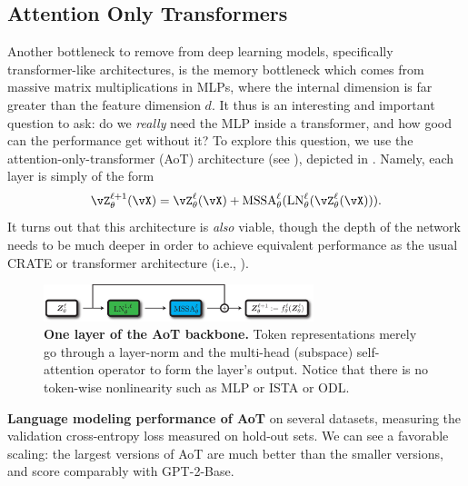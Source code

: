 \documentclass[../../book-main.tex]{subfiles}
\begin{document}
\subsection{Attention Only Transformers} \label{sub:aot_experiments}

Another bottleneck to remove from deep learning models, specifically transformer-like architectures, is the memory bottleneck which comes from massive matrix multiplications in MLPs, where the internal dimension is far greater than the feature dimension \(d\). It thus is an interesting and important question to ask: do we \textit{really} need the MLP inside a transformer, and how good can the performance get without it? To explore this question, we use the attention-only-transformer (AoT) architecture (see ), depicted in . Namely, each layer is simply of the form 
\begin{equation}
    \vZ_{\theta}^{\ell + 1}(\vX) = \vZ_{\theta}^{\ell}(\vX) + \MSSA_{\theta}^{\ell}(\LN_{\theta}^{\ell}(\vZ_{\theta}^{\ell}(\vX))).
\end{equation}
It turns out that this architecture is \textit{also} viable, though the depth of the network needs to be much deeper in order to achieve equivalent performance as the usual CRATE or transformer architecture (i.e., ).


\begin{figure}
    \centering 
    \includegraphics[width=0.7\textwidth]{figs_chap7/aot_backbone.pdf}
    \caption{\small\textbf{One layer of the AoT backbone.} Token representations merely go through a layer-norm and the multi-head (subspace) self-attention operator to form the layer's output. Notice that there is no token-wise nonlinearity such as MLP or ISTA or ODL.}
    \label{fig:aot_backbone}
\end{figure}

\begin{table}
    \centering 
    \caption{\small\textbf{Language modeling performance of AoT} on several datasets, measuring the validation cross-entropy loss measured on hold-out sets. We can see a favorable scaling: the largest versions of AoT are much better than the smaller versions, and score comparably with GPT-2-Base.}
    \label{tab:aot_lm}
\end{table}
\end{document}
